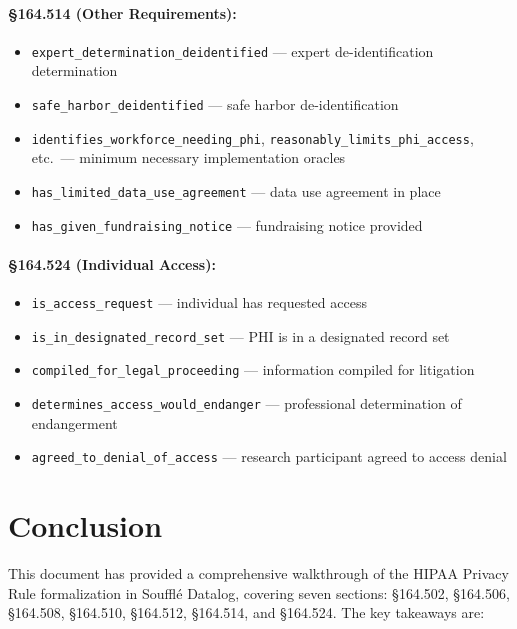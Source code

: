 \documentclass[11pt,letterpaper]{article}
\begin{document}
\paragraph{\S 164.514 (Other Requirements):}
\begin{itemize}[nosep]
  \item \texttt{expert\_determination\_deidentified} --- expert de-identification determination
  \item \texttt{safe\_harbor\_deidentified} --- safe harbor de-identification
  \item \texttt{identifies\_workforce\_needing\_phi}, \texttt{reasonably\_limits\_phi\_access}, etc.\ --- minimum necessary implementation oracles
  \item \texttt{has\_limited\_data\_use\_agreement} --- data use agreement in place
  \item \texttt{has\_given\_fundraising\_notice} --- fundraising notice provided
\end{itemize}

\paragraph{\S 164.524 (Individual Access):}
\begin{itemize}[nosep]
  \item \texttt{is\_access\_request} --- individual has requested access
  \item \texttt{is\_in\_designated\_record\_set} --- PHI is in a designated record set
  \item \texttt{compiled\_for\_legal\_proceeding} --- information compiled for litigation
  \item \texttt{determines\_access\_would\_endanger} --- professional determination of endangerment
  \item \texttt{agreed\_to\_denial\_of\_access} --- research participant agreed to access denial
\end{itemize}


\section{Conclusion}

This document has provided a comprehensive walkthrough of the HIPAA Privacy Rule formalization in Souffl\'{e} Datalog, covering seven sections: \S 164.502, \S 164.506, \S 164.508, \S 164.510, \S 164.512, \S 164.514, and \S 164.524. The key takeaways are:
\end{document}
